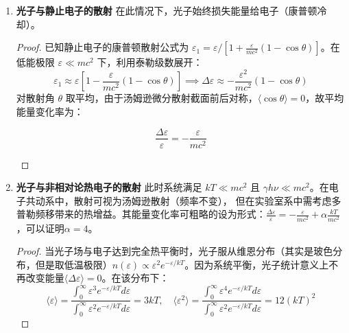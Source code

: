 \begin{enumerate}[label = (\arabic*)]
    \item \textbf{光子与静止电子的散射}
    在此情况下，光子始终损失能量给电子（康普顿冷却）。
    \begin{proof}
    已知静止电子的康普顿散射公式为 $\varepsilon_1 = \varepsilon / [1 + \frac{\varepsilon}{mc^2}(1-\cos\theta)]$。在低能极限 $\varepsilon \ll mc^2$ 下，利用泰勒级数展开：
    \begin{equation}
        \varepsilon_1 \approx \varepsilon \left[ 1 - \frac{\varepsilon}{mc^2}(1-\cos\theta) \right] \implies \Delta \varepsilon \approx -\frac{\varepsilon^2}{mc^2}(1-\cos\theta)
    \end{equation}
    对散射角 $\theta$ 取平均，由于汤姆逊微分散射截面前后对称，$\langle \cos\theta \rangle = 0$，故平均能量变化率为：
    \begin{tcolorbox}[colframe=black, colback=white, boxrule=0.5pt, arc=0pt]
    \begin{equation}
        \frac{\Delta \varepsilon}{\varepsilon} = -\frac{\varepsilon}{mc^2}
    \end{equation}
    \end{tcolorbox}
    \end{proof}
    \item \textbf{光子与非相对论热电子的散射}
    此时系统满足 $kT \ll mc^2$ 且 $\gamma h\nu \ll mc^2$。在电子共动系中，散射可视为汤姆逊散射（频率不变），
    但在实验室系中需考虑多普勒频移带来的热增益。其能量变化率可粗略的设为形式：$\frac{\Delta \varepsilon}{\varepsilon} = -\frac{\varepsilon}{mc^2} + \alpha \frac{kT}{mc^2}$，可以证明$\alpha = 4$。
    \begin{proof}
    当光子场与电子达到完全热平衡时，光子服从维恩分布（其实是玻色分布，但是取低温极限）$n(\varepsilon) \propto \varepsilon^2 e^{-\varepsilon/kT}$。因为系统平衡，光子统计意义上不再改变能量$\langle \Delta \varepsilon \rangle = 0$。在该分布下：
    \begin{equation}
        \langle \varepsilon \rangle = \frac{\int_0^\infty \varepsilon^3 e^{-\varepsilon/kT} d\varepsilon}{\int_0^\infty \varepsilon^2 e^{-\varepsilon/kT} d\varepsilon} = 3kT, \quad \langle \varepsilon^2 \rangle = \frac{\int_0^\infty \varepsilon^4 e^{-\varepsilon/kT} d\varepsilon}{\int_0^\infty \varepsilon^2 e^{-\varepsilon/kT} d\varepsilon} = 12(kT)^2
    \end{equation}

\end{proof}
\end{enumerate}
